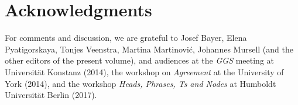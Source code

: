 \documentclass[output=paper
,modfonts
,nonflat]{langsci/langscibook}
\begin{document}
\section*{Acknowledgments}
For comments and discussion, we are grateful to Josef Bayer, Elena
Pyatigorskaya, Tonjes Veenstra, Martina Martinovi\'c, Johannes Mursell
(and the other editors of the present volume), and audiences at the
{\itshape GGS} meeting at Universit{\"a}t Konstanz (2014), the workshop on
{\itshape Agreement} at the University of York (2014), and the workshop
{\itshape Heads, Phrases, Ts and Nodes} at Humboldt Universit{\"a}t Berlin (2017).

{\sloppy
\printbibliography[heading=subbibliography,notkeyword=this]}
\end{document}
